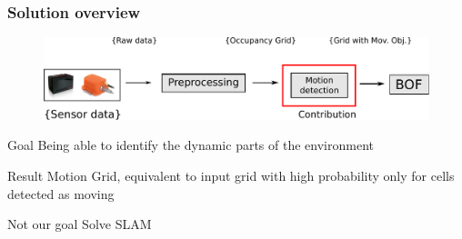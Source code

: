 \documentclass{beamer}
\begin{document}
	\begin{frame}
		\frametitle{Solution overview}
		\begin{figure}[h]
			\center
			\includegraphics[scale=0.6]{img/fig:motion:overview:01}
		 \end{figure}
		\begin{block}{Goal}
			 Being able to identify the dynamic parts of the environment
		\end{block}
		 
		\begin{block}{Result}
			Motion Grid, equivalent to input grid with high probability only for cells detected as moving
		\end{block}				 

		\begin{alertblock}{Not our goal}
			Solve SLAM
		\end{alertblock}
	\end{frame}
\end{document}
